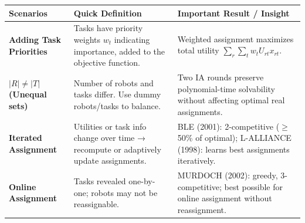\begin{table}[h!]
\centering
\renewcommand{\arraystretch}{1.2}
\begin{tabularx}{\textwidth}{@{}p{2.5cm}|p{6.7cm}|X@{}}
\toprule
\textbf{Scenarios} & \textbf{Quick Definition} & \textbf{Important Result / Insight} \\ \midrule
\textbf{Adding Task Priorities} & Tasks have priority weights \(w_t\) indicating importance, added to the objective function. & Weighted assignment maximizes total utility \(\sum_r \sum_t w_t U_{rt} x_{rt}\). \\ \addlinespace
\textbf{$|R| \neq |T|$ (Unequal sets)} & Number of robots and tasks differ. Use dummy robots/tasks to balance. & Two IA rounds preserve polynomial-time solvability without affecting optimal real assignments. \\ \addlinespace
\textbf{Iterated Assignment} & Utilities or task info change over time → recompute or adaptively update assignments. & BLE (2001): 2-competitive ($\geq$50\% of optimal); L-ALLIANCE (1998): learns best assignments iteratively. \\ \addlinespace
\textbf{Online Assignment} & Tasks revealed one-by-one; robots may not be reassignable. & MURDOCH (2002): greedy, 3-competitive; best possible for online assignment without reassignment. \\
\bottomrule
\end{tabularx}
\label{tab:st-sr-ia-summary}
\end{table}

